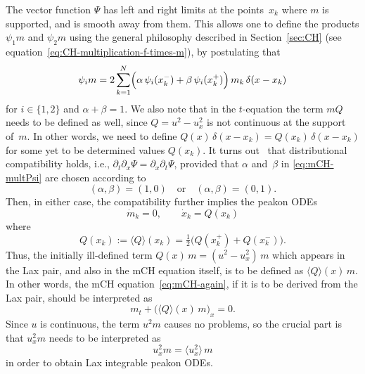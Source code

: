 \documentclass[10pt,a4paper]{article} \pdfoutput=1 
\begin{document}
The vector function $\Psi$ has left and right limits at the points~$x_k$ where $m$ is supported,
and is smooth away from them.
This allows one to define the products $\psi_1 m$ and $\psi_2 m$
using the general philosophy described in Section~\ref{sec:CH}
(see equation~\eqref{eq:CH-multiplication-f-times-m}), by postulating that
\begin{equation}
  \label{eq:mCH-multPsi}
  \psi_i m = 2\sum_{k=1}^N \Bigl( \alpha \, \psi_i(x_k^-) + \beta \, \psi_i(x_k^+) \Bigr) \, m_k \, \delta(x-x_k)
\end{equation}
for $i \in \{ 1,2 \}$ and $\alpha+\beta=1$.
We also note that in the $t$-equation the term $mQ$ needs to be defined as well,
since $Q = u^2-u_x^2$ is not continuous at the support of~$m$.
In other words, we need to define
$Q(x) \, \delta(x-x_k) = Q(x_k) \, \delta(x-x_k)$
for some yet to be determined values $Q(x_k)$.
It turns out~\cite[Appendix~A]{chang-szmigielski:2018:mCH-Lax-integrability-peakon-problem}
that distributional compatibility holds,
i.e., $\partial _t \partial_x \Psi = \partial_x \partial_t \Psi$,
provided that $\alpha$ and~$\beta$ in \eqref{eq:mCH-multPsi} are chosen according to
\begin{equation}
  \label{eq:mCH-alpha-beta}
  (\alpha,\beta)=(1,0)
  \quad\text{or}\quad
  (\alpha,\beta)=(0,1)
  .
\end{equation}
Then, in either case, the compatibility further implies the peakon ODEs
\begin{equation}
  \label{eq:mCH-distrcompatibility}
  \dot m_k=0
  , \qquad
  \dot x_k = Q(x_k)
\end{equation}
where
\begin{equation}
  Q(x_k) := \langle Q \rangle (x_k)
  = \tfrac12 \bigl( Q(x_k^+) + Q(x_k^-) \bigr)
  .
\end{equation}
Thus, the initially ill-defined term
$Q(x) \, m = (u^2-u_x^2) \, m$
which appears in the Lax pair, and also in the mCH equation itself,
is to be defined as $\langle Q \rangle (x) \, m$.
In other words, the mCH equation~\eqref{eq:mCH-again},
if it is to be derived from the Lax pair, should be interpreted as
\begin{equation}
  \label{eq:mCH-distr}
  m_t + \bigl( \langle Q \rangle (x) \, m \bigr)_x = 0
  .
\end{equation}
Since $u$ is continuous, the term $u^2 m$ causes no problems,
so the crucial part is that $u_x^2 m$ needs to be interpreted as
\begin{equation}
  \label{eq:mCH-lax-regularization}
  u_x^2 m = \langle u_x^2 \rangle \, m
\end{equation}
in order to obtain Lax integrable peakon ODEs.
\end{document}
